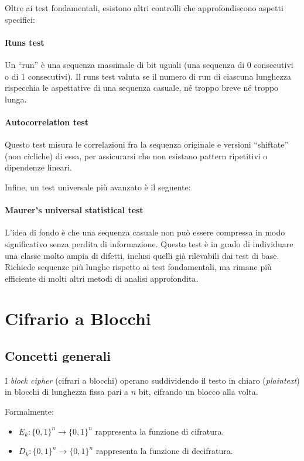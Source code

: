 \documentclass{report}
\begin{document}
Oltre ai test fondamentali, esistono altri controlli che approfondiscono aspetti specifici:

\paragraph{Runs test}  
Un “run” è una sequenza massimale di bit uguali (una sequenza di 0 consecutivi o di 1 consecutivi). Il runs test valuta se il numero di run di ciascuna lunghezza rispecchia le aspettative di una sequenza casuale, né troppo breve né troppo lunga.

\paragraph{Autocorrelation test}  
Questo test misura le correlazioni fra la sequenza originale e versioni “shiftate” (non cicliche) di essa, per assicurarsi che non esistano pattern ripetitivi o dipendenze lineari.

Infine, un test universale più avanzato è il seguente:

\paragraph{Maurer’s universal statistical test}  
L’idea di fondo è che una sequenza casuale non può essere compressa in modo significativo senza perdita di informazione. Questo test è in grado di individuare una classe molto ampia di difetti, inclusi quelli già rilevabili dai test di base. Richiede sequenze più lunghe rispetto ai test fondamentali, ma rimane più efficiente di molti altri metodi di analisi approfondita.



\section{Cifrario a Blocchi}

\subsection{Concetti generali}

I \textit{block cipher} (cifrari a blocchi) operano suddividendo il testo in chiaro (\textit{plaintext}) in blocchi di lunghezza fissa pari a $n$ bit, cifrando un blocco alla volta.

Formalmente:
\begin{itemize}
    \item $E_k: \{0,1\}^n \rightarrow \{0,1\}^n$ rappresenta la funzione di cifratura.
    \item $D_k: \{0,1\}^n \rightarrow \{0,1\}^n$ rappresenta la funzione di decifratura.
\end{itemize}
\end{document}
